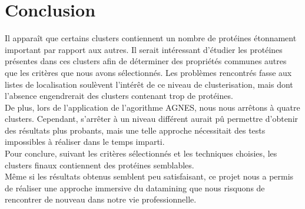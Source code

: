 \section*{Conclusion}


Il appara\^it que certains clusters contiennent un nombre de protéines étonnament important par rapport aux autres. Il serait intéressant d'étudier les protéines présentes dans ces clusters afin de déterminer des propriétés communes autres que les critères que nous avons sélectionnés.
Les problèmes rencontrés fasse aux listes de localisation soulèvent l'intér\^et de ce niveau de clusterisation, mais dont l'absence engendrerait des clusters contenant trop de protéines. \\
De plus, lors de l'application de l'agorithme AGNES, nous nous arr\^etons à quatre clusters. Cependant, s'arr\^eter à un niveau différent aurait p\^u permettre d'obtenir des résultats plus probants, mais une telle approche nécessitait des tests impossibles à réaliser dans le temps imparti.\\

Pour conclure, suivant les critères sélectionnés et les techniques choisies, les clusters finaux contiennent des protéines semblables.\\
M\^eme si les résultats obtenus semblent peu satisfaisant, ce projet nous a permis de réaliser une approche immersive du datamining que nous risquons de rencontrer de nouveau dans notre vie professionnelle.
